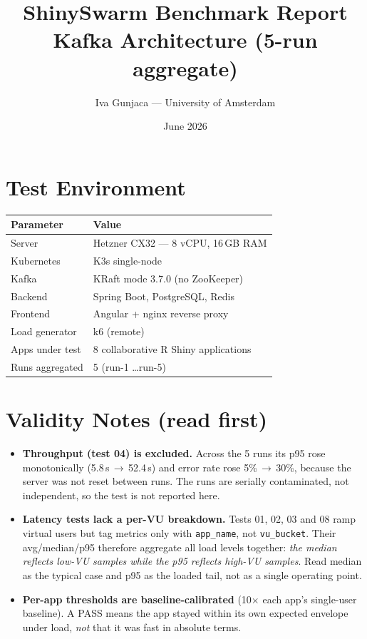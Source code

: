 \documentclass[11pt,a4paper]{article}
\title{ShinySwarm Benchmark Report\\[4pt]\large Kafka Architecture (5-run aggregate)}
\author{Iva Gunjaca — University of Amsterdam}
\date{June 2026}
\begin{document}
\maketitle

\section{Test Environment}

\begin{tabular}{@{}ll@{}}
\toprule
\textbf{Parameter}       & \textbf{Value} \\
\midrule
Server                    & Hetzner CX32 — 8 vCPU, 16\,GB RAM \\
Kubernetes                & K3s single-node \\
Kafka                     & KRaft mode 3.7.0 (no ZooKeeper) \\
Backend                   & Spring Boot, PostgreSQL, Redis \\
Frontend                  & Angular + nginx reverse proxy \\
Load generator            & k6 (remote) \\
Apps under test           & 8 collaborative R Shiny applications \\
Runs aggregated           & 5 (run-1 \ldots run-5) \\
\bottomrule
\end{tabular}

\section*{Validity Notes (read first)}

\begin{itemize}
  \item \textbf{Throughput (test 04) is excluded.} Across the 5 runs its p95
        rose monotonically (5.8\,s\,$\to$\,52.4\,s) and error rate rose
        5\%\,$\to$\,30\%, because the server was not reset between runs. The
        runs are serially contaminated, not independent, so the test is not
        reported here.
  \item \textbf{Latency tests lack a per-VU breakdown.} Tests 01, 02, 03 and
        08 ramp virtual users but tag metrics only with \texttt{app\_name},
        not \texttt{vu\_bucket}. Their avg/median/p95 therefore aggregate all
        load levels together: \emph{the median reflects low-VU samples while
        the p95 reflects high-VU samples}. Read median as the typical case and
        p95 as the loaded tail, not as a single operating point.
  \item \textbf{Per-app thresholds are baseline-calibrated} (10$\times$ each
        app's single-user baseline). A PASS means the app stayed within its
        own expected envelope under load, \emph{not} that it was fast in
        absolute terms.
\end{itemize}
\end{document}
